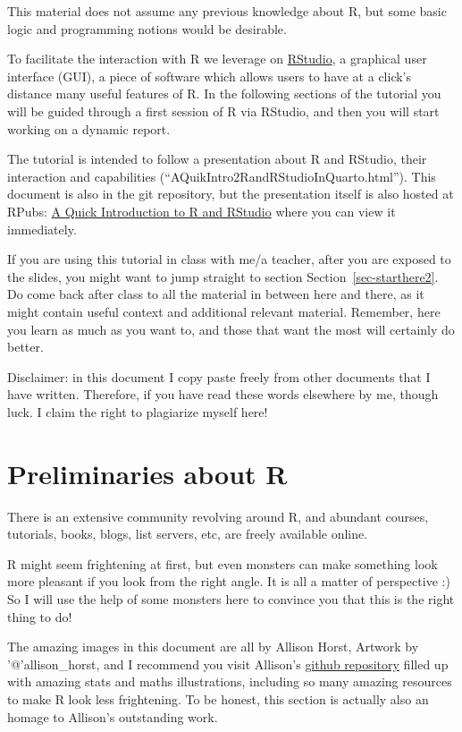 \documentclass[
  letterpaper,
  DIV=11,
  numbers=noendperiod]{scrartcl}
\begin{document}
This material does not assume any previous knowledge about R, but some
basic logic and programming notions would be desirable.

To facilitate the interaction with R we leverage on
\href{https://www.rstudio.com/}{RStudio}, a graphical user interface
(GUI), a piece of software which allows users to have at a click's
distance many useful features of R. In the following sections of the
tutorial you will be guided through a first session of R via RStudio,
and then you will start working on a dynamic report.

The tutorial is intended to follow a presentation about R and RStudio,
their interaction and capabilities
(``AQuikIntro2RandRStudioInQuarto.html''). This document is also in the
git repository, but the presentation itself is also hosted at RPubs:
\href{https://rpubs.com/talomarques/1342657}{A Quick Introduction to R
and RStudio} where you can view it immediately.

If you are using this tutorial in class with me/a teacher, after you are
exposed to the slides, you might want to jump straight to section
Section~\ref{sec-starthere2}. Do come back after class to all the
material in between here and there, as it might contain useful context
and additional relevant material. Remember, here you learn as much as
you want to, and those that want the most will certainly do better.

Disclaimer: in this document I copy paste freely from other documents
that I have written. Therefore, if you have read these words elsewhere
by me, though luck. I claim the right to plagiarize myself here!

\section{Preliminaries about R}\label{preliminaries-about-r}

There is an extensive community revolving around R, and abundant
courses, tutorials, books, blogs, list servers, etc, are freely
available online.

R might seem frightening at first, but even monsters can make something
look more pleasant if you look from the right angle. It is all a matter
of perspective :) So I will use the help of some monsters here to
convince you that this is the right thing to do!

The amazing images in this document are all by Allison Horst, Artwork by
'@'allison\_horst, and I recommend you visit Allison's
\href{https://github.com/allisonhorst/stats-illustrations}{github
repository} filled up with amazing stats and maths illustrations,
including so many amazing resources to make R look less frightening. To
be honest, this section is actually also an homage to Allison's
outstanding work.
\end{document}
